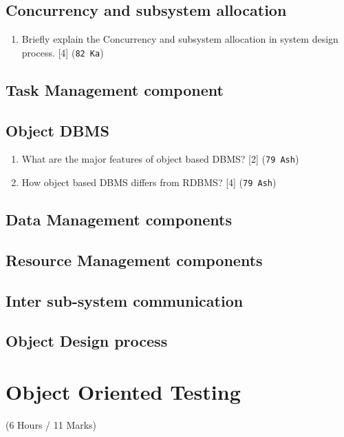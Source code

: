 \documentclass[12pt]{article}
\begin{document}
  \subsection{Concurrency and subsystem allocation}
    \begin{enumerate}
      \item Briefly explain the Concurrency and subsystem allocation in system design process. \hfill [4] (\texttt{82 Ka})
    \end{enumerate}

  \subsection{Task Management component}
  \subsection{Object DBMS}
    \begin{enumerate}
      \item What are the major features of object based DBMS? \hfill [2] (\texttt{79 Ash})

      \item How object based DBMS differs from RDBMS? \hfill [4] (\texttt{79 Ash})
    \end{enumerate}

  \subsection{Data Management components}
  \subsection{Resource Management components}
  \subsection{Inter sub-system communication}
  \subsection{Object Design process}

\pagebreak

\section{Object Oriented Testing}
  \begin{center} (6 Hours / 11 Marks) \end{center}
\end{document}
